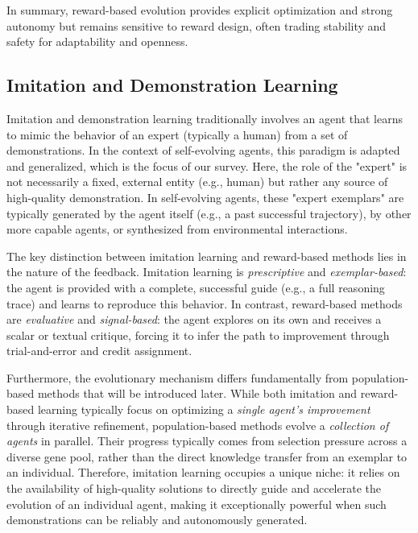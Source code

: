 \documentclass[10pt]{article} %
\begin{document}
In summary, reward-based evolution provides explicit optimization and strong autonomy but remains sensitive to reward design, often trading stability and safety for adaptability and openness.



\subsection{Imitation and Demonstration Learning}


Imitation and demonstration learning traditionally involves an agent that learns to mimic the behavior of an expert (typically a human) from a set of demonstrations. In the context of self-evolving agents, this paradigm is adapted and generalized, which is the focus of our survey. Here, the role of the "expert" is not necessarily a fixed, external entity (e.g., human) but rather any source of high-quality demonstration. In self-evolving agents, these "expert exemplars" are typically generated by the agent itself (e.g., a past successful trajectory), by other more capable agents, or synthesized from environmental interactions.

The key distinction between imitation learning and reward-based methods lies in the nature of the feedback. Imitation learning is \textit{prescriptive} and \textit{exemplar-based}: the agent is provided with a complete, successful guide (e.g., a full reasoning trace) and learns to reproduce this behavior. In contrast, reward-based methods are \textit{evaluative} and \textit{signal-based}: the agent explores on its own and receives a scalar or textual critique, forcing it to infer the path to improvement through trial-and-error and credit assignment.

Furthermore, the evolutionary mechanism differs fundamentally from population-based methods that will be introduced later. While both imitation and reward-based learning typically focus on optimizing a \textit{single agent's improvement} through iterative refinement, population-based methods evolve a \textit{collection of agents} in parallel. Their progress typically comes from selection pressure across a diverse gene pool, rather than the direct knowledge transfer from an exemplar to an individual. Therefore, imitation learning occupies a unique niche: it relies on the availability of high-quality solutions to directly guide and accelerate the evolution of an individual agent, making it exceptionally powerful when such demonstrations can be reliably and autonomously generated.
\end{document}
